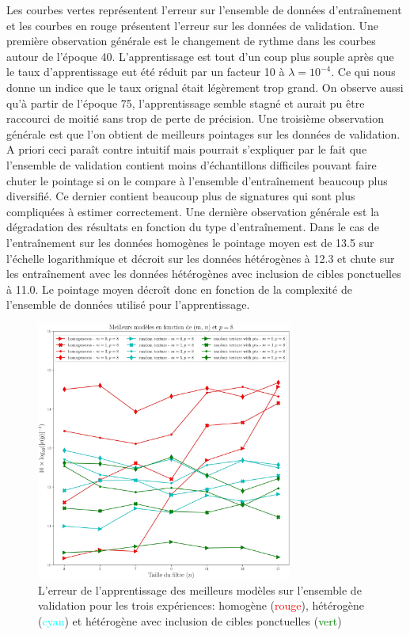 Les courbes vertes représentent l'erreur sur l'ensemble de données d'entraînement et les courbes en rouge présentent l'erreur sur les données de validation. Une première observation générale est le changement de rythme dans les courbes autour de l'époque 40. L'apprentissage est tout d'un coup plus souple après que le taux d'apprentissage eut été réduit par un facteur 10 à $\lambda=10^{-4}$. Ce qui nous donne un indice que le taux orignal était légèrement trop grand. On observe aussi qu'à partir de l'époque 75, l'apprentissage semble stagné et aurait pu être raccourci de moitié sans trop de perte de précision. Une troisième observation générale est que l'on obtient de meilleurs pointages sur les données de validation. A priori ceci paraît contre intuitif mais pourrait s'expliquer par le fait que l'ensemble de validation contient moins d'échantillons difficiles pouvant faire chuter le pointage si on le compare à l'ensemble d'entraînement beaucoup plus diversifié. Ce dernier contient beaucoup plus de signatures qui sont plus compliquées à estimer correctement. Une dernière observation générale est la dégradation des résultats en fonction du type d'entraînement. Dans le cas de l'entraînement sur les données homogènes le pointage moyen est de 13.5 sur l'échelle logarithmique et décroit sur les données hétérogènes à 12.3  et chute sur les entraînement avec les données hétérogènes avec inclusion de cibles ponctuelles à 11.0. Le pointage moyen décroît donc en fonction de la complexité de l'ensemble de données utilisé pour l'apprentissage.   

\begin{figure}[!htbp] 
\includegraphics[width=0.75\textwidth]{figures/Chap4/results/best_curves_m=all_p=8_n=all.jpg}
 \centering
  \caption{
  \small{L'erreur de l'apprentissage des meilleurs modèles sur l'ensemble de validation pour les trois expériences: homogène (\textcolor{red}{rouge}), hétérogène (\textcolor{cyan}{cyan}) et hétérogène avec inclusion de cibles ponctuelles (\textcolor{green}{vert}) }
  }
  \label{fig:best_curves_m=all_p=8_n=all}
\end{figure}


